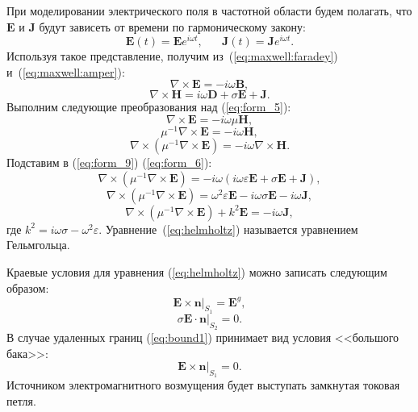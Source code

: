 \documentclass[a4paper,14pt]{article}
\begin{document}
При моделировании электрического поля в частотной области будем полагать, что $\mathbf{E}$ и $\mathbf{J}$ будут зависеть от времени по гармоническому закону:
\begin{equation*}
	\mathbf{E}(t) = \mathbf{E} e^{i \omega t} , \text{~~~~~} \mathbf{J}(t) = \mathbf{J} e^{i \omega t} .
\end{equation*}
Используя такое представление, получим из~(\ref{eq:maxwell:faradey}) и~(\ref{eq:maxwell:amper}):
\begin{equation}
	\nabla \times \mathbf{E} = - i \omega \mathbf{B} , \label{eq:form_5}
\end{equation}
\begin{equation}
	\nabla \times \mathbf{H} = i \omega \mathbf{D} + \sigma \mathbf{E} + \mathbf{J} . \label{eq:form_6}
\end{equation}
Выполним следующие преобразования над (\ref{eq:form_5}):
\begin{equation*}
	\nabla \times \mathbf{E} = - i \omega \mu \mathbf{H} ,
\end{equation*}
\begin{equation*}
	\mu^{-1} \nabla \times \mathbf{E} = - i \omega \mathbf{H} ,
\end{equation*}
\begin{equation}
	\nabla \times ( \mu^{-1} \nabla \times \mathbf{E} ) = - i \omega \nabla \times \mathbf{H} . \label{eq:form_9}
\end{equation}
Подставим в (\ref{eq:form_9}) (\ref{eq:form_6}):\nopagebreak
\begin{equation*}
	\nabla \times ( \mu^{-1} \nabla \times \mathbf{E} ) = - i \omega ( i \omega \varepsilon \mathbf{E} + \sigma \mathbf{E} + \mathbf{J} ) ,
\end{equation*}
\begin{equation*}
	\nabla \times ( \mu^{-1} \nabla \times \mathbf{E} ) = \omega^{2} \varepsilon \mathbf{E} - i \omega \sigma \mathbf{E} - i \omega \mathbf{J} ,
\end{equation*}
\begin{equation}
	\nabla \times ( \mu^{-1} \nabla \times \mathbf{E} ) + k^{2} \mathbf{E} = - i \omega \mathbf{J} , \label{eq:helmholtz}
\end{equation}
где $k^{2} = i \omega \sigma - \omega^{2} \varepsilon$. Уравнение~(\ref{eq:helmholtz}) называется уравнением Гельмгольца.

Краевые условия для уравнения (\ref{eq:helmholtz}) можно записать следующим образом:
\begin{equation}
	\left. \mathbf{E} \times \mathbf{n} \right | _{ S_1 } = {\mathbf{E}} ^g , \label{eq:bound1}
\end{equation}
\begin{equation}
	\left. \sigma \mathbf{E} \cdot \mathbf{n} \right | _{ S_2 } = 0 . \label{eq:bound2}
\end{equation}
В случае удаленных границ (\ref{eq:bound1}) принимает вид условия <<большого бака>>:
\begin{equation}
	\left. \mathbf{E} \times \mathbf{n} \right | _{ S_1 } = 0 . \label{eq:bound1_zero}
\end{equation}
Источником электромагнитного возмущения будет выступать замкнутая токовая петля.
\end{document}
